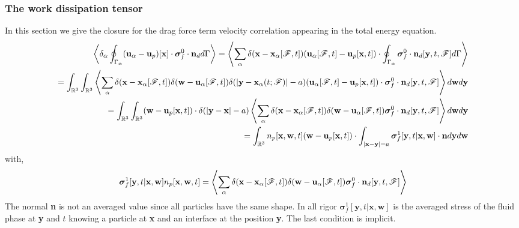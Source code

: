\subsubsection*{The work dissipation tensor}
In this section we give the closure for the drag force term velocity correlation appearing in the total energy equation. 
\begin{align*}
    \left<\delta_\alpha \oint_{\Gamma_\alpha} (\textbf{u}_\alpha - \textbf{u}_p)[\textbf{x}]\cdot  \bm\sigma_f^0\cdot \textbf{n}_d  d\Gamma\right>
    = 
    \left<
        \sum_\alpha \delta(\textbf{x}-\textbf{x}_\alpha[\mathscr{F},t] )
        (\textbf{u}_\alpha[\mathscr{F},t] - \textbf{u}_p[\textbf{x},t])\cdot  
        \oint_{\Gamma_\alpha} \bm\sigma_f^0\cdot \textbf{n}_d[\textbf{y},t,\mathscr{F}] d\Gamma
    \right>\\
    = 
    \int_{\mathbb{R}^3}
    \int_{\mathbb{R}^3}
    \left<
        \sum_\alpha 
        \delta(\textbf{x}-\textbf{x}_\alpha[\mathscr{F},t] )
        \delta(\textbf{w}-\textbf{u}_\alpha[\mathscr{F},t] )
        \delta(|\textbf{y} - \textbf{x}_{\alpha}(t;\mathscr{F})|-a)
        (\textbf{u}_\alpha[\mathscr{F},t] - \textbf{u}_p[\textbf{x},t])\cdot  
        \bm\sigma_f^0\cdot \textbf{n}_d[\textbf{y},t,\mathscr{F}]
    \right>
    d\textbf{w}
    d\textbf{y}\\
    = 
    \int_{\mathbb{R}^3}
    \int_{\mathbb{R}^3}
    (\textbf{w} - \textbf{u}_p[\textbf{x},t])\cdot  
    \delta(|\textbf{y} - \textbf{x}|-a)
    \left<
        \sum_\alpha 
        \delta(\textbf{x}-\textbf{x}_\alpha[\mathscr{F},t] )
        \delta(\textbf{w}-\textbf{u}_\alpha[\mathscr{F},t] )
        \bm\sigma_f^0\cdot \textbf{n}_d[\textbf{y},t,\mathscr{F}]
    \right>
    d\textbf{w}
    d\textbf{y}\\
    = 
    \int_{\mathbb{R}^3}
    n_p[\textbf{x},\textbf{w},t]
    (\textbf{w} - \textbf{u}_p[\textbf{x},t])\cdot  
    \int_{|\textbf{x}-\textbf{y}| = a}
    \bm\sigma_f^1[\textbf{y},t|\textbf{x},\textbf{w}]
    \cdot \textbf{n}
    d\textbf{y}
    d\textbf{w}
\end{align*}
with,
\begin{equation}
    \bm\sigma_f^1[\textbf{y},t|\textbf{x},\textbf{w}]
    n_p[\textbf{x},\textbf{w},t]
    = 
    \left<
        \sum_\alpha 
        \delta(\textbf{x}-\textbf{x}_\alpha[\mathscr{F},t] )
        \delta(\textbf{w}-\textbf{u}_\alpha[\mathscr{F},t] )
        \bm\sigma_f^0\cdot \textbf{n}_d[\textbf{y},t,\mathscr{F}]
    \right>
\end{equation}
The normal \textbf{n} is not an averaged value since all particles have the same shape. 
In all rigor $\bm\sigma_f^1[\textbf{y},t|\textbf{x},\textbf{w}]$ is the averaged stress of the fluid phase at \textbf{y} and $t$ knowing a particle at \textbf{x} and an interface at the position \textbf{y}. 
The last condition is implicit. 



